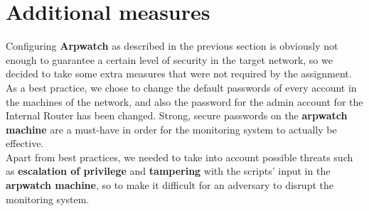 \section{Additional measures}
Configuring \textbf{Arpwatch} as described in the previous section is obviously not enough to guarantee a certain level of security in the target network, so we decided to take some extra measures that were not required by the assignment.\\
As a best practice, we chose to change the default passwords of every account in the machines of the network, and also the password for the admin account for the Internal Router has been changed. Strong, secure passwords on the \textbf{arpwatch machine} are a must-have in order for the monitoring system to actually be effective.\\
Apart from best practices, we needed to take into account possible threats such as \textbf{escalation of privilege} and \textbf{tampering} with the scripts' input in the \textbf{arpwatch machine}, so to make it difficult for an adversary to disrupt the monitoring system.

